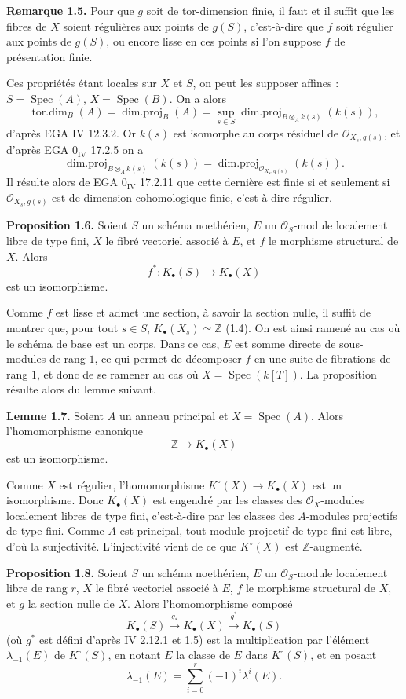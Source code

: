 \documentclass[11pt]{article}
\newcommand{\Spec}{\operatorname{Spec}}
\begin{document}
\textbf{Remarque 1.5.} Pour que $g$ soit de tor-dimension finie, il faut et il suffit que les fibres de $X$ soient régulières aux points de $g(S)$, c'est-à-dire que $f$ soit régulier aux points de $g(S)$, ou encore lisse en ces points si l'on suppose $f$ de présentation finie.

Ces propriétés étant locales sur $X$ et $S$, on peut les supposer affines : $S=\Spec(A)$, $X=\Spec(B)$. On a alors
\[
\operatorname{tor.dim}_B(A)=\operatorname{dim.proj}_B(A)=\sup_{s\in S}\operatorname{dim.proj}_{B\otimes_A k(s)}(k(s)),
\]
d'après EGA IV 12.3.2. Or $k(s)$ est isomorphe au corps résiduel de $\mathcal O_{X_s,g(s)}$, et d'après EGA $0_{\mathrm{IV}}$ 17.2.5 on a
\[
\operatorname{dim.proj}_{B\otimes_A k(s)}(k(s))=
\operatorname{dim.proj}_{\mathcal O_{X_s,g(s)}}(k(s)).
\]
Il résulte alors de EGA $0_{\mathrm{IV}}$ 17.2.11 que cette dernière est finie si et seulement si $\mathcal O_{X_s,g(s)}$ est de dimension cohomologique finie, c'est-à-dire régulier.

\textbf{Proposition 1.6.} Soient $S$ un schéma noethérien, $E$ un $\mathcal O_S$-module localement libre de type fini, $X$ le fibré vectoriel associé à $E$, et $f$ le morphisme structural de $X$. Alors
\[
f^*:K_\bullet(S)\longrightarrow K_\bullet(X)
\]
est un isomorphisme.

Comme $f$ est lisse et admet une section, à savoir la section nulle, il suffit de montrer que, pour tout $s\in S$, $K_\bullet(X_s)\simeq \mathbb Z$ (1.4). On est ainsi ramené au cas où le schéma de base est un corps. Dans ce cas, $E$ est somme directe de sous-modules de rang $1$, ce qui permet de décomposer $f$ en une suite de fibrations de rang $1$, et donc de se ramener au cas où $X=\Spec(k[T])$. La proposition résulte alors du lemme suivant.

\textbf{Lemme 1.7.} Soient $A$ un anneau principal et $X=\Spec(A)$. Alors l'homomorphisme canonique
\[
\mathbb Z\longrightarrow K_\bullet(X)
\]
est un isomorphisme.

Comme $X$ est régulier, l'homomorphisme $K^\circ(X)\to K_\bullet(X)$ est un isomorphisme. Donc $K_\bullet(X)$ est engendré par les classes des $\mathcal O_X$-modules localement libres de type fini, c'est-à-dire par les classes des $A$-modules projectifs de type fini. Comme $A$ est principal, tout module projectif de type fini est libre, d'où la surjectivité. L'injectivité vient de ce que $K^\circ(X)$ est $\mathbb Z$-augmenté.

\textbf{Proposition 1.8.} Soient $S$ un schéma noethérien, $E$ un $\mathcal O_S$-module localement libre de rang $r$, $X$ le fibré vectoriel associé à $E$, $f$ le morphisme structural de $X$, et $g$ la section nulle de $X$. Alors l'homomorphisme composé
\[
K_\bullet(S)\xrightarrow{g_*}K_\bullet(X)\xrightarrow{g^*}K_\bullet(S)
\]
(où $g^*$ est défini d'après IV 2.12.1 et 1.5) est la multiplication par l'élément $\lambda_{-1}(E)$ de $K^\circ(S)$, en notant $E$ la classe de $E$ dans $K^\circ(S)$, et en posant
\[
\lambda_{-1}(E)=\sum_{i=0}^r(-1)^i\lambda^i(E).
\]
\end{document}
